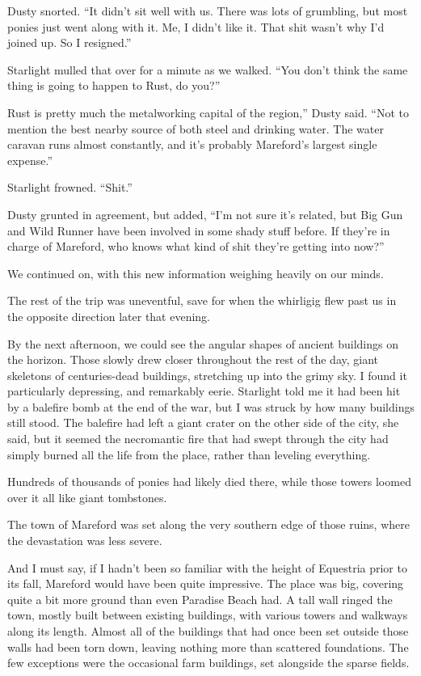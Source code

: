 Dusty snorted. “It didn’t sit well with us. There was lots of grumbling, but most ponies just went along with it. Me, I didn’t like it. That shit wasn’t why I’d joined up. So I resigned.”

Starlight mulled that over for a minute as we walked. “You don’t think the same thing is going to happen to Rust, do you?”

\leavevmode{}Rust is pretty much the metalworking capital of the region,” Dusty said. “Not to mention the best nearby source of both steel and drinking water. The water caravan runs almost constantly, and it’s probably Mareford’s largest single expense.”

Starlight frowned. “Shit.”

Dusty grunted in agreement, but added, “I’m not sure it’s related, but Big Gun and Wild Runner have been involved in some shady stuff before. If they’re in charge of Mareford, who knows what kind of shit they’re getting into now?”

We continued on, with this new information weighing heavily on our minds.

{\br}%
The rest of the trip was uneventful, save for when the whirligig flew past us in the opposite direction later that evening.

By the next afternoon, we could see the angular shapes of ancient buildings on the horizon. Those slowly drew closer throughout the rest of the day, giant skeletons of centuries-dead buildings, stretching up into the grimy sky. I found it particularly depressing, and remarkably eerie. Starlight told me it had been hit by a balefire bomb at the end of the war, but I was struck by how many buildings still stood. The balefire had left a giant crater on the other side of the city, she said, but it seemed the necromantic fire that had swept through the city had simply burned all the life from the place, rather than leveling everything.

Hundreds of thousands of ponies had likely died there, while those towers loomed over it all like giant tombstones.

The town of Mareford was set along the very southern edge of those ruins, where the devastation was less severe.

And I must say, if I hadn’t been so familiar with the height of Equestria prior to its fall, Mareford would have been quite impressive. The place was big, covering quite a bit more ground than even Paradise Beach had. A tall wall ringed the town, mostly built between existing buildings, with various towers and walkways along its length. Almost all of the buildings that had once been set outside those walls had been torn down, leaving nothing more than scattered foundations. The few exceptions were the occasional farm buildings, set alongside the sparse fields.

